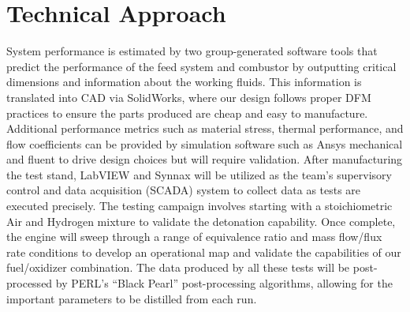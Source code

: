 \section*{Technical Approach}

System performance is estimated by two group-generated software tools that predict the performance of the feed system and combustor by outputting critical dimensions and information about the working fluids. This information is translated into CAD via SolidWorks, where our design follows proper DFM practices to ensure the parts produced are cheap and easy to manufacture. Additional performance metrics such as material stress, thermal performance, and flow coefficients can be provided by simulation software such as Ansys mechanical and fluent to drive design choices but will require validation. After manufacturing the test stand, LabVIEW and Synnax will be utilized as the team’s supervisory control and data acquisition (SCADA) system to collect data as tests are executed precisely. The testing campaign involves starting with a stoichiometric Air and Hydrogen mixture to validate the detonation capability. Once complete, the engine will sweep through a range of equivalence ratio and mass flow/flux rate conditions to develop an operational map and validate the capabilities of our fuel/oxidizer combination. The data produced by all these tests will be post-processed by PERL’s “Black Pearl” post-processing algorithms, allowing for the important parameters to be distilled from each run.